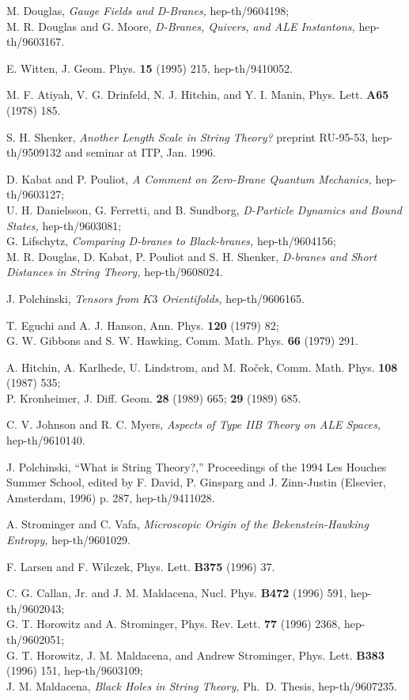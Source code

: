 \documentclass[12pt]{article}
\begin{document}
\begin{thebibliography}{99}
M. Douglas, {\it Gauge Fields and D-Branes,} hep-th/9604198;\\
M. R. Douglas and G. Moore, {\it D-Branes, Quivers, and
ALE Instantons,} hep-th/9603167.

E. Witten, J. Geom. Phys. {\bf 15} (1995) 215, hep-th/9410052.
 
M. F. Atiyah, V. G. Drinfeld, N. J. Hitchin, and Y. I. Manin, Phys. Lett.
{\bf A65} (1978) 185.

S. H. Shenker, {\it Another Length Scale in String Theory?} preprint RU-95-53,
hep-th/9509132 and seminar at ITP, Jan. 1996.

D. Kabat and P. Pouliot, {\it A Comment on Zero-Brane Quantum
Mechanics,} hep-th/9603127;\\
U. H. Danielsson, G. Ferretti, and B. Sundborg, 
{\it D-Particle Dynamics and Bound States,} hep-th/9603081;\\
G. Lifschytz, {\it Comparing D-branes to Black-branes,}
hep-th/9604156;\\
M. R. Douglas, D. Kabat, P. Pouliot and S. H. Shenker,
{\it D-branes and Short Distances in String Theory,} hep-th/9608024.

J. Polchinski, {\it Tensors from $K3$ Orientifolds,} hep-th/9606165.

T. Eguchi and A. J. Hanson, Ann. Phys. {\bf 120} (1979) 82;\\
G. W. Gibbons and S. W. Hawking, Comm. Math. Phys. {\bf 66} (1979) 291.

A. Hitchin, A. Karlhede, U. Lindstrom, and M. Ro\v cek,
Comm. Math. Phys. {\bf 108} (1987) 535;\\
P. Kronheimer, J. Diff. Geom. {\bf 28} (1989) 665; {\bf 29} (1989) 685.

C. V. Johnson and R. C. Myers, {\it Aspects of Type IIB Theory on ALE Spaces,}
hep-th/9610140.

J. Polchinski, ``What is String Theory?,'' 
Proceedings of the 1994 Les Houches Summer
School, edited by F. David, P. Ginsparg and J. Zinn-Justin
(Elsevier, Amsterdam, 1996) p. 287,
hep-th/9411028.

A. Strominger and C. Vafa, {\it Microscopic Origin of
the Bekenstein-Hawking Entropy,} hep-th/9601029.

F. Larsen and F. Wilczek, Phys. Lett. {\bf B375} (1996) 37.

C. G. Callan, Jr. and J. M. Maldacena, Nucl. Phys. {\bf B472}
(1996) 591, hep-th/9602043;\\
G. T. Horowitz and A. Strominger, Phys. Rev. Lett. {\bf 77}
(1996) 2368, hep-th/9602051;\\
G. T. Horowitz, J. M. Maldacena, and
Andrew Strominger, Phys. Lett. {\bf B383} (1996) 151, hep-th/9603109;\\
J. M. Maldacena, {\it Black Holes in String Theory,} Ph.~D. Thesis,
hep-th/9607235.


\end{thebibliography}
\end{document}
